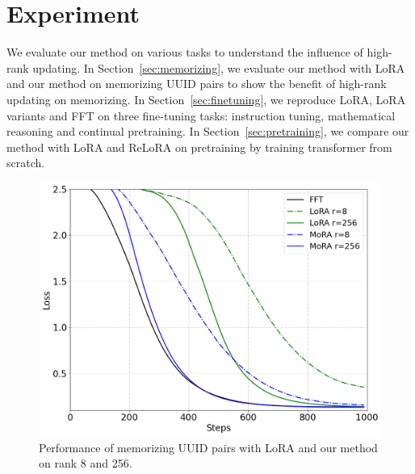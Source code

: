 \documentclass[11pt]{article}
\begin{document}
\section{Experiment}
We evaluate our method on various tasks to understand the influence of high-rank updating.
In Section~\ref{sec:memorizing}, we evaluate our method with LoRA and our method on memorizing UUID pairs to show the benefit of high-rank updating on memorizing.
In Section~\ref{sec:finetuning}, we reproduce LoRA, LoRA variants and FFT on three fine-tuning tasks: instruction tuning, mathematical reasoning and continual pretraining.
In Section~\ref{sec:pretraining}, we compare our method with LoRA and ReLoRA on pretraining by training transformer from scratch.
\begin{figure}[t]
    \centering
        \includegraphics[width=0.99\columnwidth]{moravslora-memory-lora.png}
    \caption{
      Performance of memorizing UUID pairs with LoRA and our method on rank 8 and 256.
      }
    \label{fig:moramtloss}
\vspace{-10pt}
\end{figure}
\end{document}
